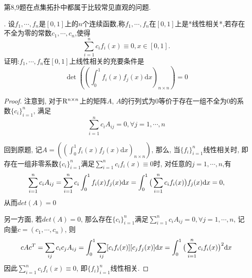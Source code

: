 \documentclass[a4paper,12pt]{article}
\begin{document}
第8,9题在点集拓扑中都属于比较常见直观的问题.

. 设$f_1,\cdots,f_n$是$[0,1]$上的$n$个连续函数,称$f_1,\cdots,f_n$在$[0,1]$上是*线性相关*,若存在不全为零的常数$c_1,\cdots,c_n$,使得
\[\sum_{i=1}^{n}c_if_i(x)\equiv0,x\in[0,1].\]
    证明:$f_1,\cdots,f_n$在$[0,1]$上线性相关的充要条件是
    \[\det\left((\int_0^1f_i(x)f_j(x)\mathrm{d}x)_{n\times n}\right)=0\]
\begin{proof}
  注意到, 对于$\mathrm{R}^{n\times n}$上的矩阵$A$, $A$的行列式为$0$等价于存在一组不全为$0$的系数$\{c_i\}_{i=1}^n$, 满足
  \[\sum_{i=1}^nc_iA_{ij}=0,\forall j=1,\cdots,n\]

  回到原题, 记$A=\left((\int_0^1f_i(x)f_j(x)\mathrm{d}x)_{n\times n}\right)$,
  那么, 当$\{f_i\}_{i=1}^n$线性相关时, 即存在一组非零系数$\{c_i\}_{i=1}^n$满足$\sum_{i=1}^n c_if_i(x)\equiv 0$时,
  对任意的$j=1,\cdots,n$,有
  \[\sum_{i=1}^nc_iA_{ij}=\sum_{i=1}^nc_i\int_0^1f_i(x)f_j(x)\mathrm{d} x=\int_0^1\big(\sum_{i=1}^nc_if_i(x)\big)f_j(x)\mathrm{d} x=0,\]
  从而$det(A)=0$

  另一方面, 若$det(A)=0$, 那么存在$\{c_i\}_{i=1}^n$满足$\sum_{i=1}^nc_iA_{ij}=0,\forall j=1,\cdots,n$,
  记向量$c=(c_1,\cdots,c_n)$, 则
  \[cAc^T=\sum_{ij}c_ic_jA_{ij}=\int_0^1\sum_{ij}[c_if_i(x)][c_jf_j(x)]\mathrm{d} x=\int_0^1\big(\sum_{i=1}^nc_if_i(x)\big)^2\mathrm{d} x\]
  因此$\sum_{i=1}^nc_if_i(x)\equiv0$, 即$\{f_i\}_{i=1}^n$线性相关.
\end{proof}
\end{document}
